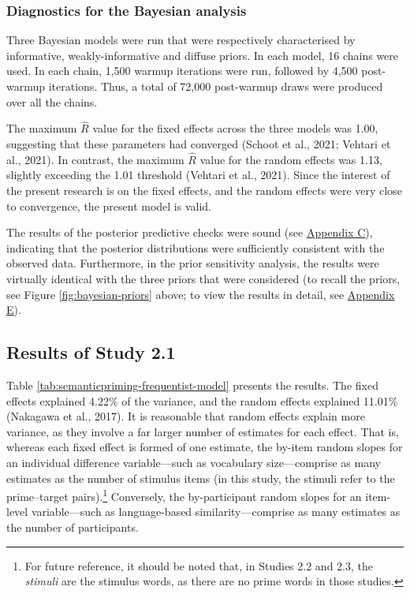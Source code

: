 \documentclass[
  12pt,
  man,floatsintext]{apa7}
\begin{document}
\hypertarget{diagnostics-for-the-bayesian-analysis}{%
\subsubsection{Diagnostics for the Bayesian analysis}\label{diagnostics-for-the-bayesian-analysis}}

Three Bayesian models were run that were respectively characterised by informative, weakly-informative and diffuse priors. In each model, 16 chains were used. In each chain, 1,500 warmup iterations were run, followed by 4,500 post-warmup iterations. Thus, a total of 72,000 post-warmup draws were produced over all the chains.

The maximum \(\widehat R\) value for the fixed effects across the three models was 1.00, suggesting that these parameters had converged (Schoot et al., 2021; Vehtari et al., 2021). In contrast, the maximum \(\widehat R\) value for the random effects was 1.13, slightly exceeding the 1.01 threshold (Vehtari et al., 2021). Since the interest of the present research is on the fixed effects, and the random effects were very close to convergence, the present model is valid.

The results of the posterior predictive checks were sound (see \protect\hyperlink{appendix-C-Bayesian-analysis-diagnostics}{\underline{Appendix C}}), indicating that the posterior distributions were sufficiently consistent with the observed data. Furthermore, in the prior sensitivity analysis, the results were virtually identical with the three priors that were considered (to recall the priors, see Figure \ref{fig:bayesian-priors} above; to view the results in detail, see \protect\hyperlink{appendix-E-Bayesian-analysis-results}{\underline{Appendix E}}).

\hypertarget{semanticpriming-results}{%
\subsection{Results of Study 2.1}\label{semanticpriming-results}}

Table \ref{tab:semanticpriming-frequentist-model} presents the results. The fixed effects explained 4.22\% of the variance, and the random effects explained 11.01\% (Nakagawa et al., 2017). It is reasonable that random effects explain more variance, as they involve a far larger number of estimates for each effect. That is, whereas each fixed effect is formed of one estimate, the by-item random slopes for an individual difference variable---such as vocabulary size---comprise as many estimates as the number of stimulus items (in this study, the stimuli refer to the prime--target pairs).\footnote{For future reference, it should be noted that, in Studies 2.2 and 2.3, the \emph{stimuli} are the stimulus words, as there are no prime words in those studies.} Conversely, the by-participant random slopes for an item-level variable---such as language-based similarity---comprise as many estimates as the number of participants.
\end{document}
